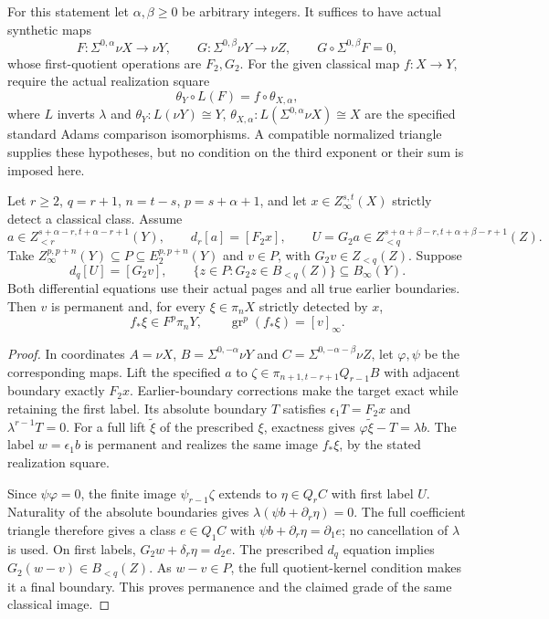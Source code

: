 \begin{corollary}
\label{sem:ProofTools:coverage-boundary-lift}
For this statement let $\alpha,\beta\ge0$ be arbitrary integers.
It suffices to have actual synthetic maps
\[
 F:\Sigma^{0,\alpha}\nu X\longrightarrow\nu Y,\qquad
 G:\Sigma^{0,\beta}\nu Y\longrightarrow\nu Z,
 \qquad G\circ\Sigma^{0,\beta}F=0,
\]
whose first-quotient operations are $F_2,G_2$.
For the given classical map $f:X\to Y$, require the actual realization
square
\[
 \theta_Y\circ L(F)=f\circ\theta_{X,\alpha},
\]
where $L$ inverts $\lambda$ and $\theta_Y:L(\nu Y)\cong Y$,
$\theta_{X,\alpha}:L(\Sigma^{0,\alpha}\nu X)\cong X$ are the
specified standard Adams comparison isomorphisms. A compatible
normalized triangle supplies these hypotheses, but no condition on
the third exponent or their sum is imposed here.

Let $r\ge2$, $q=r+1$, $n=t-s$, $p=s+\alpha+1$, and let
$x\in Z_\infty^{s,t}(X)$ strictly detect a classical class. Assume
\[
 a\in Z_{<r}^{s+\alpha-r,t+\alpha-r+1}(Y),\qquad
 d_r[a]=[F_2x],\qquad
 U=G_2a\in Z_{<q}^{s+\alpha+\beta-r,t+\alpha+\beta-r+1}(Z).
\]
Take $Z_\infty^{p,p+n}(Y)\subseteq P\subseteq E_2^{p,p+n}(Y)$
and $v\in P$, with $G_2v\in Z_{<q}(Z)$. Suppose
\[
 d_q[U]=[G_2v],\qquad
 \{z\in P:G_2z\in B_{<q}(Z)\}\subseteq B_\infty(Y).
\]
Both differential equations use their actual pages and all true earlier
boundaries. Then $v$ is permanent and, for every $\xi\in\pi_nX$
strictly detected by $x$,
\[
 f_*\xi\in F^p\pi_nY,\qquad
 \operatorname{gr}^{p}(f_*\xi)=[v]_\infty.
\]
\end{corollary}
\begin{proof}
In coordinates $A=\nu X$, $B=\Sigma^{0,-\alpha}\nu Y$ and
$C=\Sigma^{0,-\alpha-\beta}\nu Z$, let $\varphi,\psi$ be the
corresponding maps. Lift the specified $a$ to
$\zeta\in\pi_{n+1,t-r+1}Q_{r-1}B$ with adjacent boundary exactly
$F_2x$. Earlier-boundary corrections make the target exact while
retaining the first label. Its absolute boundary $T$ satisfies
$\epsilon_1T=F_2x$ and $\lambda^{r-1}T=0$.
For a full lift $\widetilde\xi$ of the prescribed $\xi$, exactness
gives $\varphi\widetilde\xi-T=\lambda b$.
The label $w=\epsilon_1b$ is permanent and realizes the same image
$f_*\xi$, by the stated realization square.

Since $\psi\varphi=0$, the finite image $\psi_{r-1}\zeta$ extends
to $\eta\in Q_rC$ with first label $U$. Naturality of the absolute
boundaries gives $\lambda(\psi b+\partial_r\eta)=0$.
The full coefficient triangle therefore gives a class $e\in Q_1C$
with $\psi b+\partial_r\eta=\partial_1e$; no cancellation of
$\lambda$ is used. On first labels,
$G_2w+\delta_r\eta=d_2e$. The prescribed $d_q$ equation implies
$G_2(w-v)\in B_{<q}(Z)$. As $w-v\in P$, the full quotient-kernel
condition makes it a final boundary. This proves permanence and the
claimed grade of the same classical image.
\end{proof}

